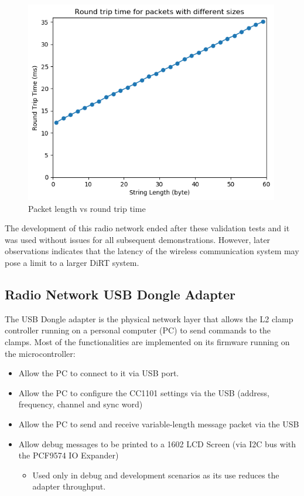 \begin{figure}[h]
    \centering
    \includegraphics[width=0.99\textwidth]{images/05/image108.png}
    \caption{Packet length vs round trip time}
    \label{fig:roundtrip-time}
\end{figure}

The development of this radio network ended after these validation tests and it was used without issues for all subsequent demonstrations. However, later observations  indicates that the latency of the wireless communication system may pose a limit to a larger DiRT system.

\subsection{Radio Network USB Dongle Adapter}
\label{subsection:exploration-2-radio-network-usb-dongle-adapter}

The USB Dongle adapter is the physical network layer that allows the L2 clamp controller running on a personal computer (PC) to send commands to the clamps. Most of the functionalities are implemented on its firmware running on the microcontroller:

\begin{itemize}[nosep]
    \item Allow the PC to connect to it via USB port.
    \item Allow the PC to configure the CC1101 settings via the USB (address, frequency, channel and sync word)
    \item Allow the PC to send and receive variable-length message packet via the USB
    \item Allow debug messages to be printed to a 1602 LCD Screen (via I2C bus with the PCF9574 IO Expander)
    \begin{itemize}
        \item Used only in debug and development scenarios as its use reduces the adapter throughput.
    \end{itemize}
\end{itemize}

